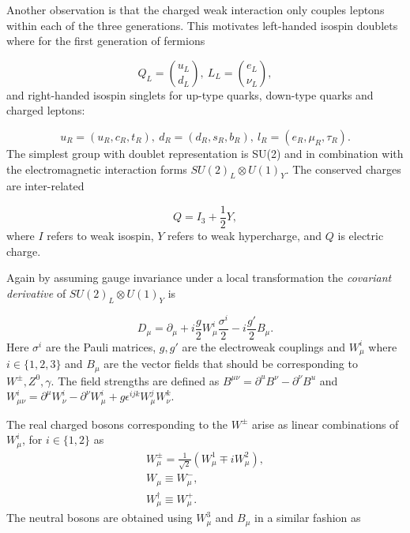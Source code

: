 Another observation is that the charged weak interaction only couples leptons within each of the three generations. This motivates left-handed isospin doublets where for the first generation of fermions

\begin{equation}
Q_{L} = \binom{u_{L}}{d_{L}}, ~L_{L} = \binom{e_{L}}{\nu_{L}},
	\label{eq:defdou}
\end{equation}
and right-handed isospin singlets for up-type quarks, down-type quarks and charged leptons:

\begin{equation}
	u_{R}=(u_{R},c_{R},t_{R}),~
	d_{R}=(d_{R},s_{R},b_{R}),~
	l_{R}=(e_{R},\mu_{R},\tau_{R}).
	\label{eq:defsin}
\end{equation}
The simplest group with doublet representation is SU(2) and in combination with the electromagnetic interaction forms $SU(2)_{L} \otimes U(1)_{Y}$. The conserved charges are inter-related 

\begin{equation}
	Q=I_{3} + \frac{1}{2}Y,
\end{equation}
where $I$ refers to weak isospin, $Y$ refers to weak hypercharge, and $Q$ is electric charge.

Again by assuming gauge invariance under a local transformation the \textit{covariant derivative} of $SU(2)_{L}\otimes U(1)_{Y}$ is 

\begin{equation}
	D_{\mu} = \partial_{\mu} + i\frac{g}{2}W_{\mu}^{i} \frac{\sigma^{i}}{2} - i \frac{g'}{2}B_{\mu}. 
\label{eq:covdev}
\end{equation}
Here $\sigma^{i}$ are the Pauli matrices, $g,g'$ are the electroweak couplings and $W_{\mu}^{i}$ where $i\in\{1,2,3\}$ and $B_{\mu}$ are the vector fields that should be corresponding to $W^{\pm},Z^{0},\gamma$.
The field strengths are defined as $B^{\mu\nu}=\partial^{u}B^{\nu} - \partial^{\nu}B^{u}$ and $W^{i}_{\mu\nu} = \partial^{\mu}W^{i}_{\nu} - \partial^{\nu}W^{i}_{\mu}+ g\epsilon^{ijk}W_{\mu}^{j}W_{\nu}^{k}$.

The real charged bosons corresponding to the $W^{\pm}$ arise as linear combinations of $W^{i}_{\mu}$, for $i\in\{1,2\}$ as
\begin{equation}
\begin{split}
W^{\pm}_{\mu} = \frac{1}{\sqrt{2}}(W^{1}_{\mu}\mp iW^{2}_{\mu}),
\\
W_{\mu} \equiv W^{-}_{\mu},
\\
W^{\dagger}_{\mu} \equiv W^{+}_{\mu}. 
\end{split}
\end{equation} 
The neutral bosons are obtained using $W_{\mu}^{3}$ and $B_{\mu}$ in a similar fashion as


